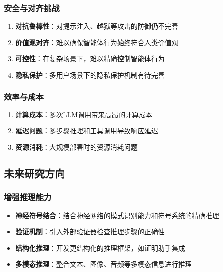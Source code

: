 \subsubsection{安全与对齐挑战}

\begin{enumerate}[leftmargin=2em]
    \item \textbf{对抗鲁棒性}：对提示注入、越狱等攻击的防御仍不完善
    
    \item \textbf{价值观对齐}：难以确保智能体行为始终符合人类价值观
    
    \item \textbf{可控性}：在复杂场景下，难以精确控制智能体行为
    
    \item \textbf{隐私保护}：多用户场景下的隐私保护机制有待完善
\end{enumerate}

\subsubsection{效率与成本}

\begin{enumerate}[leftmargin=2em]
    \item \textbf{计算成本}：多次LLM调用带来高昂的计算成本
    \item \textbf{延迟问题}：多步骤推理和工具调用导致响应延迟
    \item \textbf{资源消耗}：大规模部署时的资源消耗问题
\end{enumerate}

\subsection{未来研究方向}

\subsubsection{增强推理能力}

\begin{itemize}[leftmargin=2em]
    \item \textbf{神经符号结合}：结合神经网络的模式识别能力和符号系统的精确推理
    \item \textbf{验证机制}：引入外部验证器检查推理步骤的正确性
    \item \textbf{结构化推理}：开发更结构化的推理框架，如证明助手集成
    \item \textbf{多模态推理}：整合文本、图像、音频等多模态信息进行推理
\end{itemize}

